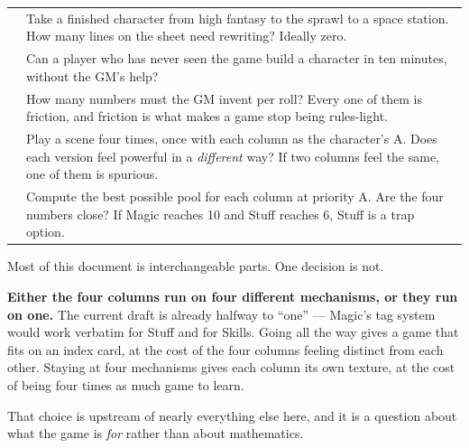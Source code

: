 \documentclass[11pt,oneside]{memoir}
\begin{document}
\begin{statblock}
\begin{tabularx}{\linewidth}{@{}p{3.6cm} Y@{}}
 & Take a finished character from high fantasy to the sprawl to a space station. How many lines on the sheet need rewriting? Ideally zero.\\[4pt]
 & Can a player who has never seen the game build a character in ten minutes, without the GM's help?\\[4pt]
 & How many numbers must the GM invent per roll? Every one of them is friction, and friction is what makes a game stop being rules-light.\\[4pt]
 & Play a scene four times, once with each column as the character's A. Does each version feel powerful in a \emph{different} way? If two columns feel the same, one of them is spurious.\\[4pt]
 & Compute the best possible pool for each column at priority A. Are the four numbers close? If Magic reaches 10 and Stuff reaches 6, Stuff is a trap option.\\
\end{tabularx}
\end{statblock}

\begin{dread}
Most of this document is interchangeable parts. One decision is not.

\textbf{Either the four columns run on four different mechanisms, or they
run on one.} The current draft is already halfway to ``one'' --- Magic's
tag system would work verbatim for Stuff and for Skills. Going all the
way gives a game that fits on an index card, at the cost of the four
columns feeling distinct from each other. Staying at four mechanisms gives
each column its own texture, at the cost of being four times as much game
to learn.

That choice is upstream of nearly everything else here, and it is a
question about what the game is \emph{for} rather than about mathematics.
\end{dread}
\end{document}
